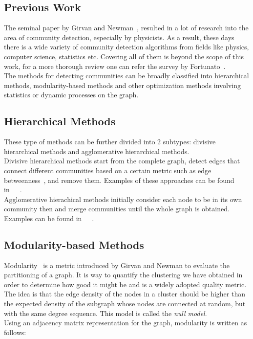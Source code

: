 \begin{spacing}{1.5}
\section{Previous Work}

The seminal paper by Girvan and Newman~\cite{Girvan11062002}, resulted in a lot of research into the area of community detection, especially by physicists. As a result, these days there is a wide variety of community detection algorithms from fields like physics, computer science, statistics etc. Covering all of them is beyond the scope of this work, for a more thorough review one can refer the survey by Fortunato~\cite{Fortunato201075}.\\
\indent The methods for detecting communities can be broadly classified into hierarchical methods, modularity-based methods and other optimization methods involving statistics or dynamic processes on the graph.

\subsection{Hierarchical Methods}

These type of methods can be further divided into 2 subtypes: divisive hierarchical methods and agglomerative hierarchical methods.\\
\indent Divisive hierarchical methods start from the complete graph, detect edges that connect different communities based on a certain metric such as edge betweenness~\cite{Girvan11062002}, and remove them. Examples of these approaches can be found in~\cite{Girvan11062002}~\cite{Radicchi02032004}~\cite{PhysRevE.69.026113}.\\
\indent Agglomerative hierachical methods initially consider each node to be in its own community then and merge communities until the whole graph is obtained. Examples can be found in~\cite{newman03fast}~\cite{blondel2008fuc}~\cite{Clauset2004}.

\subsection{Modularity-based Methods}

Modularity~\cite{PhysRevE.69.026113} is a metric introduced by Girvan and Newman to evaluate the partitioning of a graph. It is way to quantify the clustering we have obtained in order to determine how good it might be and is a widely adopted quality metric. The idea is that the edge density of the nodes in a cluster should be higher than the expected density of the subgraph whose nodes are connected at random, but with the same degree sequence. This model is called the \emph{null model}. \\
\indent Using an adjacency matrix representation for the graph, modularity is written as follows:


\end{spacing}
